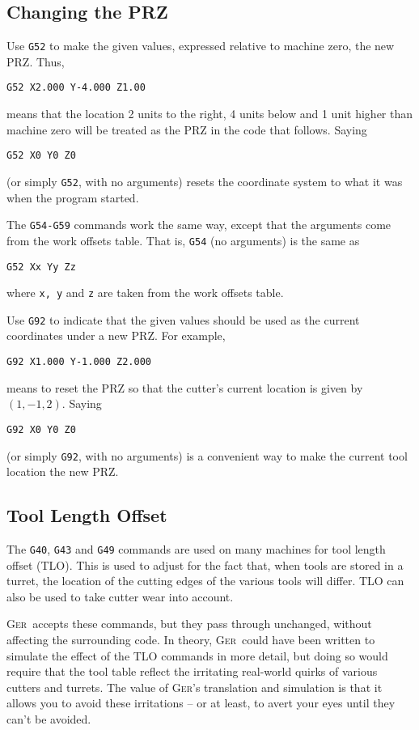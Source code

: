 \documentclass[titlepage,oneside,10pt]{article}
\newcommand{\ger}{\textsc{Ger}}
\begin{document}
\subsection{Changing the PRZ}

Use {\tt G52} to make the given values, expressed relative to machine
zero, the new PRZ. Thus, 
\begin{verbatim}
G52 X2.000 Y-4.000 Z1.00
\end{verbatim}
means that the location 2 units to the right, 4 units below and 1 unit
higher than machine zero will be treated as the PRZ in the code that
follows. Saying
\begin{verbatim}
G52 X0 Y0 Z0
\end{verbatim}
(or simply {\tt G52}, with no arguments) resets the coordinate system
to what it was when the program started.

The {\tt G54-G59} commands work the same way, except that the
arguments come from the work offsets table. That is, {\tt G54} (no
arguments) is the same as
\begin{verbatim}
G52 Xx Yy Zz
\end{verbatim}
where {\tt x, y} and {\tt z} are taken from the work offsets table. 

Use {\tt G92} to indicate that the given values should be used as the
current coordinates under a new PRZ. For example, 
\begin{verbatim}
G92 X1.000 Y-1.000 Z2.000
\end{verbatim}
means to reset the PRZ so that the cutter's current location is given
by $(1,-1,2)$. Saying 
\begin{verbatim}
G92 X0 Y0 Z0
\end{verbatim}
(or simply {\tt G92}, with no arguments) is a convenient way to make
the current tool location the new PRZ.

\subsection{Tool Length Offset}

The {\tt G40}, {\tt G43} and {\tt G49} commands are used on many
machines for tool length offset (TLO). This is used to adjust for the
fact that, when tools are stored in a turret, the location of the
cutting edges of the various tools will differ. TLO can also be used
to take cutter wear into account. 

\ger\ accepts these commands, but they pass through unchanged, without
affecting the surrounding code. In theory, \ger\ could have been
written to simulate the effect of the TLO commands in more detail, but
doing so would require that the tool table reflect the irritating
real-world quirks of various cutters and turrets. The value of \ger's
translation and simulation is that it allows you to avoid these
irritations -- or at least, to avert your eyes until they can't be avoided. 
\end{document}
